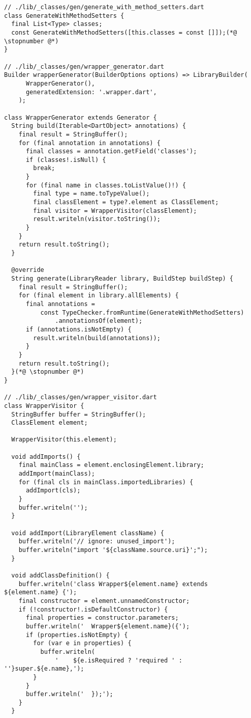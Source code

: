 \begin{lstlisting}
// ./lib/_classes/gen/generate_with_method_setters.dart
class GenerateWithMethodSetters {
  final List<Type> classes;
  const GenerateWithMethodSetters([this.classes = const []]);(*@ \stopnumber @*)
}

// ./lib/_classes/gen/wrapper_generator.dart
Builder wrapperGenerator(BuilderOptions options) => LibraryBuilder(
      WrapperGenerator(),
      generatedExtension: '.wrapper.dart',
    );

class WrapperGenerator extends Generator {
  String build(Iterable<DartObject> annotations) {
    final result = StringBuffer();
    for (final annotation in annotations) {
      final classes = annotation.getField('classes');
      if (classes!.isNull) {
        break;
      }
      for (final name in classes.toListValue()!) {
        final type = name.toTypeValue();
        final classElement = type?.element as ClassElement;
        final visitor = WrapperVisitor(classElement);
        result.writeln(visitor.toString());
      }
    }
    return result.toString();
  }

  @override
  String generate(LibraryReader library, BuildStep buildStep) {
    final result = StringBuffer();
    for (final element in library.allElements) {
      final annotations =
          const TypeChecker.fromRuntime(GenerateWithMethodSetters)
              .annotationsOf(element);
      if (annotations.isNotEmpty) {
        result.writeln(build(annotations));
      }
    }
    return result.toString();
  }(*@ \stopnumber @*)
}
  
// ./lib/_classes/gen/wrapper_visitor.dart
class WrapperVisitor {
  StringBuffer buffer = StringBuffer();
  ClassElement element;

  WrapperVisitor(this.element);

  void addImports() {
    final mainClass = element.enclosingElement.library;
    addImport(mainClass);
    for (final cls in mainClass.importedLibraries) {
      addImport(cls);
    }
    buffer.writeln('');
  }

  void addImport(LibraryElement className) {
    buffer.writeln('// ignore: unused_import');
    buffer.writeln("import '${className.source.uri}';");
  }

  void addClassDefinition() {
    buffer.writeln('class Wrapper${element.name} extends ${element.name} {');
    final constructor = element.unnamedConstructor;
    if (!constructor!.isDefaultConstructor) {
      final properties = constructor.parameters;
      buffer.writeln('  Wrapper${element.name}({');
      if (properties.isNotEmpty) {
        for (var e in properties) {
          buffer.writeln(
              '    ${e.isRequired ? 'required ' : ''}super.${e.name},');
        }
      }
      buffer.writeln('  });');
    }
  }


\end{lstlisting}
